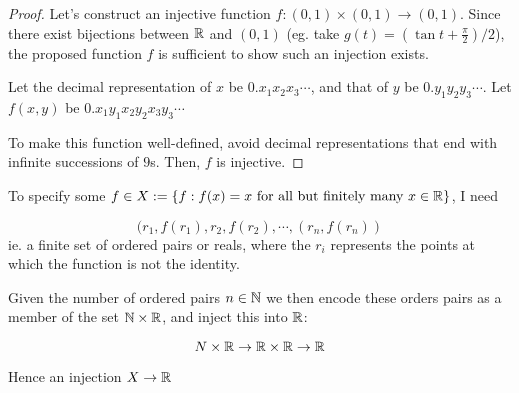 \documentclass[a4paper]{article}
\begin{document}
\begin{proof}
	Let's construct an injective function $ f : (0,1) \times (0,1) \to (0,1) $. Since there exist bijections between $ \mathbb{R} $ and $ (0,1) $ (eg. take $ g(t) = (\tan t + \frac{\pi}{2})/2 $), the proposed function $ f $ is sufficient to show such an injection exists.
	
	
	Let the decimal representation of $ x $ be $ 0.x_{1}x_{2}x_{3}\cdots $, and that of $ y $ be $ 0.y_{1}y_{2}y_{3}\cdots $. Let $ f(x,y) $ be $ 0.x_{1}y_{1}x_{2}y_{2}x_{3}y_{3}\cdots $
	
	To make this function well-defined, avoid decimal representations that end with infinite successions of $ 9 $s. Then, $ f $ is injective. 
\end{proof}

To specify some $ f \in X : = \{  f : f(x) = x \text{ for all but finitely many } x \in \mathbb{R}   \}$, I need

\[ (r_{1},f(r_{1}), r_{2},f(r_{2} ),\cdots,(r_{n},f(r_{n})) \] ie. a finite set of ordered pairs or reals, where the $ r_{i} $ represents the points at which the function is not the identity.

Given the number of ordered pairs $ n \in \mathbb{N} $ we then encode these orders pairs as a member of the set $ \mathbb{N} \times \mathbb{R} $, and inject this into $ \mathbb{R} $:

\[ N \times \mathbb{R} \to \mathbb{R} \times \mathbb{R} \to \mathbb{R} \]

Hence an injection $ X \to \mathbb{R} $ 
\end{document}

